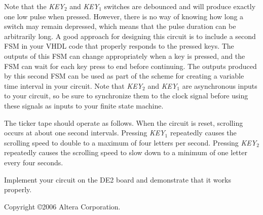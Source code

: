 \documentclass[epsfig,10pt,fullpage]{article}
\begin{document}
Note that the {\it KEY}$_2$ and {\it KEY}$_1$ switches are debounced and will produce exactly one
low pulse when pressed. However, there is no way of knowing how long a switch may
remain depressed, which means that the pulse duration can be arbitrarily long. A good
approach for designing this circuit is to include a second FSM in your VHDL 
code that properly responds to the pressed keys. The outputs of this FSM can change
appropriately when a key is pressed, and the FSM can wait for each key press to end
before continuing. The outputs produced by this second FSM can be used as
part of the scheme for creating a variable time interval in your circuit. Note
that {\it KEY}$_2$ and {\it KEY}$_1$ are asynchronous inputs to your circuit, so
be sure to synchronize them to the clock signal before using these signals as
inputs to your finite state machine.

The ticker tape should operate as follows. When the circuit is reset, scrolling 
occurs at about one second intervals. Pressing {\it KEY}$_1$ repeatedly causes the 
scrolling speed to double to a maximum of four letters per second.
Pressing {\it KEY}$_2$ repeatedly causes the 
scrolling speed to slow down to a minimum of one letter every four seconds.

Implement your circuit on the DE2 board and demonstrate that it works properly.

\vskip 2in
Copyright \copyright 2006 Altera Corporation. 
\end{document}
